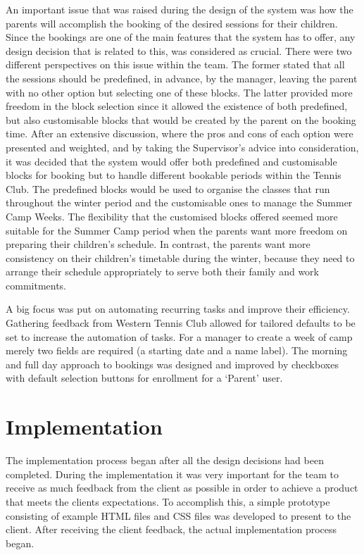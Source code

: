 \documentclass{l3proj}
\begin{document}
\par An important issue that was raised during the design of the system was how the parents will accomplish the booking of the desired sessions for their children. Since the bookings are one of the main features that the system has to offer, any design decision that is related to this, was considered as crucial. There were two different perspectives on this issue within the team. The former stated that all the sessions should be predefined, in advance, by the manager, leaving the parent with no other option but selecting one of these blocks. The latter provided more freedom in the block selection since it allowed the existence of both predefined, but also customisable blocks that would be created by the parent on the booking time. After an extensive discussion, where the pros and cons of each option were presented and weighted, and by taking the  Supervisor's advice into consideration, it was decided that the system would offer both predefined and customisable blocks for booking but to handle different bookable periods within the Tennis Club. The predefined blocks would be used to organise the classes that run throughout the winter period and the customisable ones to manage the Summer Camp Weeks. The flexibility that the customised blocks offered seemed more suitable for the Summer Camp period when the parents want more freedom on preparing their children's schedule. In contrast, the parents want more consistency on their children's timetable during the winter, because they need to arrange their schedule appropriately to serve both their family and work commitments.\\
\par A big focus was put on automating recurring tasks and improve their efficiency. Gathering feedback from Western Tennis Club allowed for tailored defaults to be set to increase the automation of tasks. For a manager to create a week of camp merely two fields are required (a starting date and a name label). The morning and full day approach to bookings was designed and improved by checkboxes with default selection buttons for enrollment for a `Parent' user.\\


\chapter{Implementation}
\label{impl}
The implementation process began after all the design decisions had been completed. During the implementation it was very important for the team to receive as much feedback from the client as possible in order to achieve a product that meets the clients expectations. To accomplish this, a simple prototype consisting of example HTML files and CSS files was developed to present to the client. After receiving the client feedback, the actual implementation process began.
\end{document}
